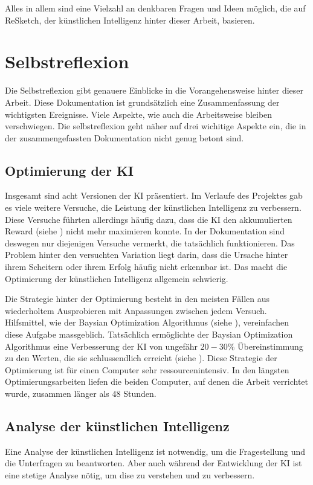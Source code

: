 Alles in allem sind eine Vielzahl an denkbaren Fragen und Ideen möglich, die auf
ReSketch, der künstlichen Intelligenz hinter dieser Arbeit, basieren.


\section{Selbstreflexion}\label{chap:d_reflex}
Die Selbstreflexion gibt genauere Einblicke in die Vorangehensweise hinter
dieser Arbeit. Diese Dokumentation ist grundsätzlich eine Zusammenfassung der wichtigsten
Ereignisse. Viele Aspekte, wie auch die Arbeitsweise bleiben verschwiegen. Die
selbstreflexion geht näher auf drei wichitige Aspekte ein, die in der
zusammengefassten Dokumentation nicht genug betont sind.

\subsection{Optimierung der KI}\label{sub:d_reflex_opti}
Insgesamt sind acht Versionen der KI präsentiert. Im Verlaufe des Projektes gab
es viele weitere Versuche, die Leistung der künstlichen Intelligenz zu
verbessern. Diese Versuche führten allerdings häufig dazu, dass die KI den
akkumulierten Reward (siehe ) nicht mehr maximieren
konnte. In der Dokumentation sind deswegen nur diejenigen Versuche vermerkt, die
tatsächlich funktionieren. Das Problem hinter den versuchten Variation liegt
darin, dass die Ursache hinter ihrem Scheitern oder ihrem Erfolg häufig nicht
erkennbar ist. Das macht die Optimierung der künstlichen Intelligenz allgemein
schwierig. 

Die Strategie hinter der Optimierung besteht in den meisten Fällen aus
wiederholtem Ausprobieren mit Anpassungen zwischen jedem Versuch. Hilfsmittel,
wie der Baysian Optimization Algorithmus (siehe ),
vereinfachen diese Aufgabe massgeblich. Tatsächlich ermöglichte der Baysian
Optimization Algorithmus eine Verbesserung der KI von ungefähr $20-30\%$
Übereinstimmung zu den Werten, die sie schlussendlich erreicht (siehe
). Diese Strategie der Optimierung ist für einen Computer
sehr ressourcenintensiv. In den längsten Optimierungsarbeiten liefen die beiden
Computer, auf denen die Arbeit verrichtet wurde, zusammen länger als $48$
Stunden.

\subsection{Analyse der künstlichen Intelligenz}\label{sub:d_reflex_analys}
Eine Analyse der künstlichen Intelligenz ist notwendig, um die Fragestellung und
die Unterfragen zu beantworten. Aber auch während der Entwicklung der
KI ist eine stetige Analyse nötig, um dise zu verstehen und
zu verbessern.

